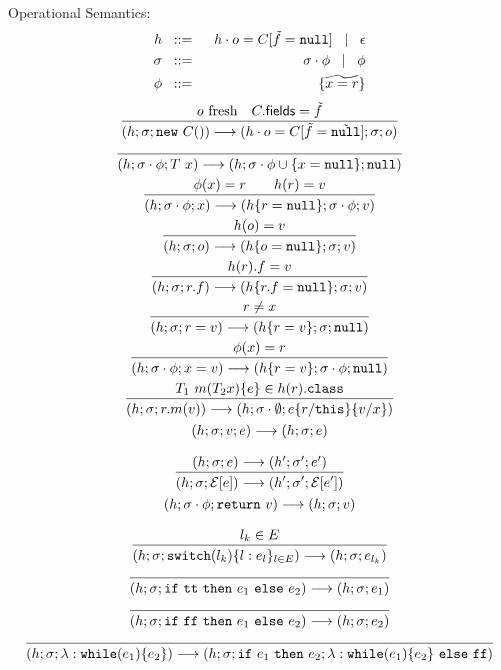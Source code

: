 \documentclass[a4paper]{llncs}
\newcommand{\class}{\ensuremath{\mathtt{class}}\xspace}
\newcommand{\nul}{\ensuremath{\mathtt{null}}\xspace}
\newcommand{\this}{\ensuremath{\mathtt{this}}\xspace}
\newcommand{\return}[1]{\ensuremath{\mathtt{return}}\ #1}
\newcommand{\method}[4]{#1\ #2(#3)\set{#4}}
\newcommand{\vdecl}[2]{#1\ #2}
\newcommand{\newo}[1]{\ensuremath{\mathtt{new}\ #1()}}
\newcommand{\switch}[2]{\ensuremath{\mathtt{switch}(#1)\set{#2}}}
\newcommand{\while}[2]{\ensuremath{\mathtt{while}(#1)\set{#2}}}
\newcommand{\econtext}[2]{\mathcal{#1}[#2]}
\begin{document}
%
	Operational Semantics:
%
	\begin{eqnarray*}
		h &\bnfis& h \cat o = C[\vect{f} = \vec{\nul}] \bnfbar \epsilon\\
		\sigma &\bnfis& \sigma \cat \phi \bnfbar \phi\\
		\phi &\bnfis& \set{\widetilde{x = r}}
	\end{eqnarray*}
%
\[
	\begin{array}{c}
		\tree{
			o\ \textrm{fresh} \quad C.\mathsf{fields} = \vect{f}
		}{
			(h; \sigma; \newo{C}) \red (h \cat o = C[\vect{f} = \vect{\nul}]; \sigma; o)
		}
		\\[4mm]

		\tree{
		}{
			(h; \sigma \cat \phi; \vdecl{T}{x}) \red (h; \sigma \cat \phi \cup \set{x = \nul}; \nul)
		}
		\\[4mm]

		\tree{
			\phi(x) = r \qquad h(r) = v
		}{
			(h; \sigma \cat \phi; x) \red (h \set{r = \nul}; \sigma \cat \phi; v)
		}
		\\[4mm]

		\tree{
			h(o) = v
		}{
			(h; \sigma; o) \red (h \set{o = \nul}; \sigma; v)
		}\\[4mm]

		\tree{
			h(r).f = v
		}{
			(h; \sigma; r.f) \red (h \set{r.f = \nul}; \sigma; v)
		}\\[4mm]

		\tree {
			r \not= x
		}{
			(h;\sigma; r = v) \red (h\set{r = v};\sigma; \nul)
		}\\[4mm]

		\tree {
			\phi(x) = r
		}{
			(h;\sigma \cat \phi; x = v) \red (h\set{r = v};\sigma \cat \phi; \nul)
		}\\[4mm]


		\tree {
			\method{T_1}{m}{T_2 x}{e} \in h(r).\class 
		}{
			(h;\sigma;r.m(v)) \red (h; \sigma \cat \es; e \subst{r}{\this} \subst{v}{x})
		}\\[4mm]

		(h; \sigma; v; e) \red (h; \sigma; e)
		\\[4mm]

		\tree{
			(h; \sigma; e) \red (h'; \sigma'; e')
		}{
			(h; \sigma; \econtext{E}{e}) \red (h'; \sigma'; \econtext{E}{e'})
		}
		\\[4mm]

		(h;\sigma \cat \phi; \return{v}) \red (h;\sigma;v)
		\\[4mm]

		\tree{
			l_k \in E
		}{
			(h;\sigma;\switch{l_k}{l: e_l}_{l \in E}) \red (h;\sigma; e_{l_k})
		}\\[4mm]

		\tree{
		}{
			(h; \sigma; \ifthenelse{\true}{e_1}{e_2}) \red (h; \sigma; e_1)
		}
		\\[4mm]

		\tree{
		}{
			(h; \sigma; \ifthenelse{\false}{e_1}{e_2}) \red (h; \sigma; e_2)
		}
		\\[4mm]

		\tree{
		}{
			(h; \sigma; \lambda: \while{e_1}{e_2}) \red (h; \sigma; \ifthenelse{e_1}{e_2 ;\lambda: \while{e_1}{e_2}}{\false})
		}
		\\[4mm]

	\end{array}
\]
\end{document}
